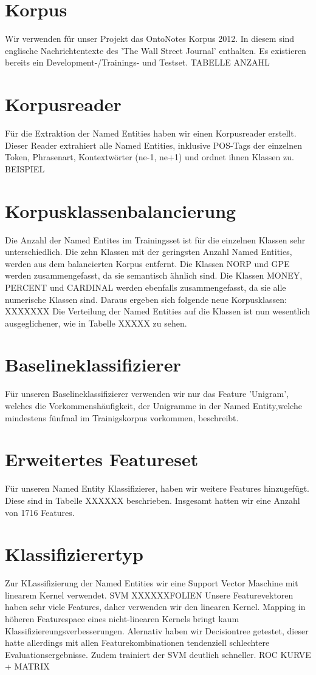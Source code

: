 \documentclass[a4paper, 11pt]{article}
\begin{document}
\section{Korpus}
Wir verwenden für unser Projekt das OntoNotes Korpus 2012. In diesem sind englische Nachrichtentexte des 'The Wall Street Journal' enthalten. Es existieren bereits ein Development-/Trainings- und Testset.
TABELLE ANZAHL
\section{Korpusreader}
Für die Extraktion der Named Entities haben wir einen Korpusreader erstellt. Dieser Reader extrahiert alle Named Entities, inklusive POS-Tags der einzelnen Token, Phrasenart, Kontextwörter (ne-1, ne+1) und ordnet ihnen Klassen zu.
BEISPIEL
\section{Korpusklassenbalancierung}
Die Anzahl der Named Entites im Trainingsset ist für die einzelnen Klassen sehr unterschiedlich. Die zehn Klassen mit der geringsten Anzahl Named Entities, werden aus dem balancierten Korpus entfernt. Die Klassen NORP und GPE werden zusammengefasst, da sie semantisch ähnlich sind. Die Klassen MONEY, PERCENT und CARDINAL werden ebenfalls zusammengefasst, da sie alle numerische Klassen sind.
Daraus ergeben sich folgende neue Korpusklassen: XXXXXXX
Die Verteilung der Named Entities auf die Klassen ist nun wesentlich ausgeglichener, wie in Tabelle XXXXX zu sehen.
\section{Baselineklassifizierer}
Für unseren Baselineklassifizierer verwenden wir nur das Feature 'Unigram', welches die Vorkommenshäufigkeit, der Unigramme in der Named Entity,welche mindestens fünfmal im Trainigskorpus vorkommen, beschreibt.
\section{Erweitertes Featureset}
Für unseren Named Entity Klassifizierer, haben wir weitere Features hinzugefügt. Diese sind in Tabelle XXXXXX beschrieben. Insgesamt hatten wir eine Anzahl von 1716 Features.
\section{Klassifizierertyp}
Zur KLassifizierung der Named Entities wir eine Support Vector Maschine mit linearem Kernel verwendet. SVM XXXXXXFOLIEN
Unsere Featurevektoren haben sehr viele Features, daher verwenden wir den linearen Kernel. Mapping in höheren Featurespace eines nicht-linearen Kernels bringt kaum Klassifiziereungsverbesserungen. Alernativ haben wir Decisiontree getestet, dieser hatte allerdings mit allen Featurekombinationen tendenziell schlechtere Evaluationsergebnisse. Zudem trainiert der SVM deutlich schneller. ROC KURVE + MATRIX
\end{document}
